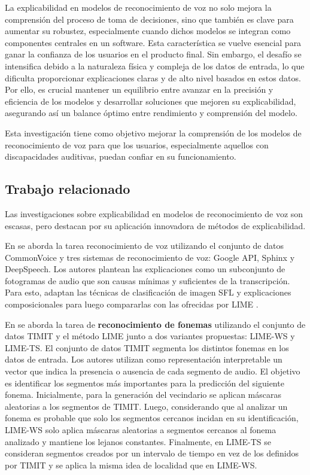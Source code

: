 \documentclass[conference]{IEEEtran}
\begin{document}
La explicabilidad en modelos de reconocimiento de voz no solo mejora la comprensión del proceso de toma de decisiones, sino que también es clave para aumentar su robustez, especialmente cuando dichos modelos se integran como componentes centrales en un software. Esta característica se vuelve esencial para ganar la confianza de los usuarios en el producto final. Sin embargo, el desafío se intensifica debido a la naturaleza física y compleja de los datos de entrada, lo que dificulta proporcionar explicaciones claras y de alto nivel basados en estos datos. Por ello, es crucial mantener un equilibrio entre avanzar en la precisión y eficiencia de los modelos y desarrollar soluciones que mejoren su explicabilidad, asegurando así un balance óptimo entre rendimiento y comprensión del modelo.

Esta investigación tiene como objetivo mejorar la comprensión de los modelos de reconocimiento de voz para que los usuarios, especialmente aquellos con discapacidades auditivas, puedan confiar en su funcionamiento.

\subsection{Trabajo relacionado}

Las investigaciones sobre explicabilidad en modelos de reconocimiento de voz son escasas, pero destacan por su aplicación innovadora de métodos de explicabilidad.

En \cite{10094635} se aborda la tarea reconocimiento de voz utilizando el conjunto de datos CommonVoice \cite{commonvoice:2020} y tres sistemas de reconocimiento de voz: Google API, Sphinx y DeepSpeech. Los autores plantean las explicaciones como un subconjunto de fotogramas de audio que son causas mínimas y suficientes de la transcripción. Para esto, adaptan las técnicas de clasificación de imagen SFL \cite{sun2020explaining} y explicaciones composicionales \cite{unknown} para luego compararlas con las ofrecidas por LIME \cite{ribeiro2016why}.

En \cite{wu2023trust} se aborda la tarea de \textbf{reconocimiento de fonemas} utilizando el conjunto de datos TIMIT \cite{timit} y el método LIME junto a dos variantes propuestas: LIME-WS y LIME-TS. El conjunto de datos TIMIT segmenta los distintos fonemas en los datos de entrada. Los autores utilizan como representación interpretable un vector que indica la presencia o ausencia de cada segmento de audio. El objetivo es identificar los segmentos más importantes para la predicción del siguiente fonema. Inicialmente, para la generación del vecindario se aplican máscaras aleatorias a los segmentos de TIMIT. Luego, considerando que al analizar un fonema es probable que solo los segmentos cercanos incidan en su identificación, LIME-WS solo aplica máscaras aleatorias a segmentos cercanos al fonema analizado y mantiene los lejanos constantes. Finalmente, en LIME-TS se consideran segmentos creados por un intervalo de tiempo en vez de los definidos por TIMIT y se aplica la misma idea de localidad que en LIME-WS.
\end{document}
